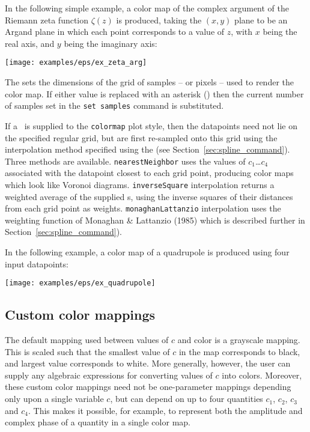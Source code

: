 In the following simple example, a color map of the complex argument of the
Riemann zeta function $\zeta(z)$ is produced, taking the $(x,y)$ plane to be an
Argand plane in which each point corresponds to a value of $z$, with $x$ being
the real axis, and $y$ being the imaginary axis:

\vspace{2mm}

\vspace{2mm}

\centerline{\texttt{[image: examples/eps/ex\_zeta\_arg]}}

The  sets the dimensions of the grid of samples -- or
pixels -- used to render the color map. If either value is replaced with an
asterisk ({\tt *}) then the current number of samples set in the {\tt set
samples} command is substituted.

If a \datafile\ is supplied to the {\tt colormap} plot style, then the
datapoints need not lie on the specified regular grid, but are first re-sampled
onto this grid using the interpolation method specified using the  (see Section~\ref{sec:spline_command}). Three methods are
available. {\tt nearest\-Neigh\-bor} uses the values of $c_1$\ldots$c_4$
associated with the datapoint closest to each grid point, producing color maps
which look like Voronoi diagrams. {\tt inverse\-Square} interpolation returns a
weighted average of the supplied \datapoint s, using the inverse squares of
their distances from each grid point as weights. {\tt monag\-han\-Lattan\-zio}
interpolation uses the weighting function of Monaghan \& Lattanzio (1985) which
is described further in Section~\ref{sec:spline_command}).

In the following example, a color map of a quadrupole is produced using four
input datapoints:

\vspace{2mm}

\vspace{2mm}

\centerline{\texttt{[image: examples/eps/ex\_quadrupole]}}

\subsection{Custom color mappings}

The default mapping used between values of $c$ and color is a grayscale
mapping. This is scaled such that the smallest value of $c$ in the map
corresponds to black, and largest value corresponds to white. More generally,
however, the user can supply any algebraic expressions for converting values of
$c$ into colors.  Moreover, these custom color mappings need not be
one-parameter mappings depending only upon a single variable $c$, but can
depend on up to four quantities $c_1$, $c_2$, $c_3$ and $c_4$. This makes it
possible, for example, to represent both the amplitude and complex phase of a
quantity in a single color map.

